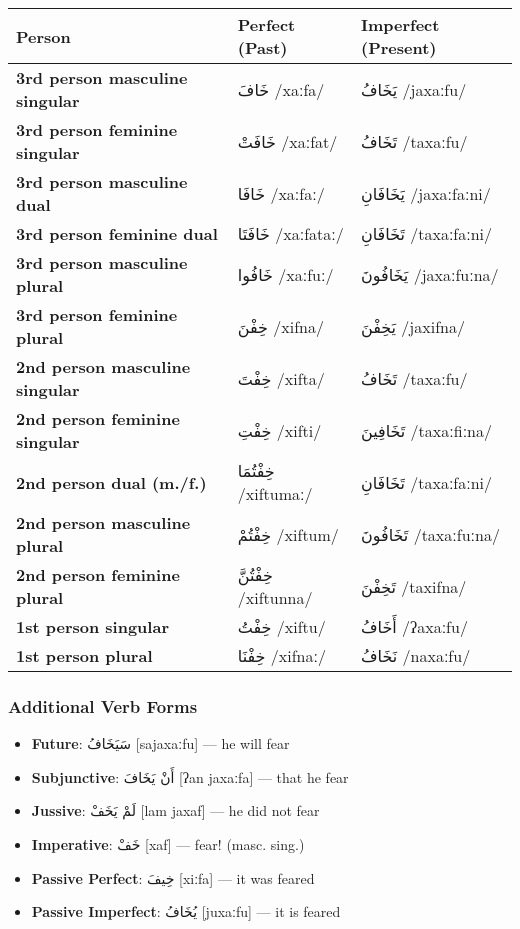 \documentclass[letterpaper,12pt]{article}
\begin{document}
\begin{longtable}{|>{\raggedright}p{3.5cm}|p{5cm}|p{5cm}|}
\hline
\textbf{Person} & \textbf{Perfect (Past)} & \textbf{Imperfect (Present)} \\
\hline
\textbf{3rd person masculine singular} & \textarabic{خَافَ} /xaːfa/ & \textarabic{يَخَافُ} /jaxaːfu/ \\
\hline
\textbf{3rd person feminine singular} & \textarabic{خَافَتْ} /xaːfat/ & \textarabic{تَخَافُ} /taxaːfu/ \\
\hline
\textbf{3rd person masculine dual} & \textarabic{خَافَا} /xaːfaː/ & \textarabic{يَخَافَانِ} /jaxaːfaːni/ \\
\hline
\textbf{3rd person feminine dual} & \textarabic{خَافَتَا} /xaːfataː/ & \textarabic{تَخَافَانِ} /taxaːfaːni/ \\
\hline
\textbf{3rd person masculine plural} & \textarabic{خَافُوا} /xaːfuː/ & \textarabic{يَخَافُونَ} /jaxaːfuːna/ \\
\hline
\textbf{3rd person feminine plural} & \textarabic{خِفْنَ} /xifna/ & \textarabic{يَخِفْنَ} /jaxifna/ \\
\hline
\textbf{2nd person masculine singular} & \textarabic{خِفْتَ} /xifta/ & \textarabic{تَخَافُ} /taxaːfu/ \\
\hline
\textbf{2nd person feminine singular} & \textarabic{خِفْتِ} /xifti/ & \textarabic{تَخَافِينَ} /taxaːfiːna/ \\
\hline
\textbf{2nd person dual (m./f.)} & \textarabic{خِفْتُمَا} /xiftumaː/ & \textarabic{تَخَافَانِ} /taxaːfaːni/ \\
\hline
\textbf{2nd person masculine plural} & \textarabic{خِفْتُمْ} /xiftum/ & \textarabic{تَخَافُونَ} /taxaːfuːna/ \\
\hline
\textbf{2nd person feminine plural} & \textarabic{خِفْتُنَّ} /xiftunna/ & \textarabic{تَخِفْنَ} /taxifna/ \\
\hline
\textbf{1st person singular} & \textarabic{خِفْتُ} /xiftu/ & \textarabic{أَخَافُ} /ʔaxaːfu/ \\
\hline
\textbf{1st person plural} & \textarabic{خِفْنَا} /xifnaː/ & \textarabic{نَخَافُ} /naxaːfu/ \\
\hline
\end{longtable}

\subsubsection*{Additional Verb Forms}
\begin{itemize}
  \item \textbf{Future}: \textarabic{سَيَخَافُ} [sajaxaːfu] — he will fear
  \item \textbf{Subjunctive}: \textarabic{أَنْ يَخَافَ} [ʔan jaxaːfa] — that he fear
  \item \textbf{Jussive}: \textarabic{لَمْ يَخَفْ} [lam jaxaf] — he did not fear
  \item \textbf{Imperative}: \textarabic{خَفْ} [xaf] — fear! (masc. sing.)
  \item \textbf{Passive Perfect}: \textarabic{خِيفَ} [xiːfa] — it was feared
  \item \textbf{Passive Imperfect}: \textarabic{يُخَافُ} [juxaːfu] — it is feared
\end{itemize}
\end{document}
